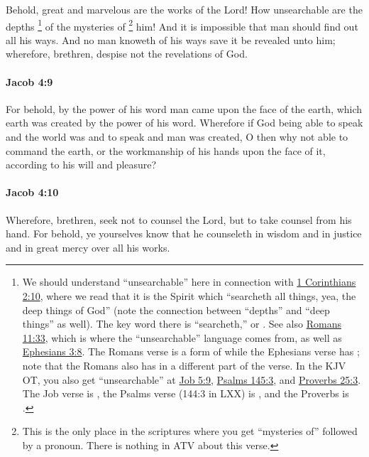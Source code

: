 			Behold, great and marvelous are the works of the Lord!
			How unsearchable are the depths%
				\footnote{%
					We should understand ``unsearchable'' here in connection with \hyperref[1CORINTHIANS-2-10]{1 Corinthians 2:10}, where we read that it is the Spirit which ``searcheth all things, yea, the deep things of God'' (note the connection between ``depths'' and ``deep things'' as well). The key word there is ``searcheth,'' or \hyperref[ERAUNAO]{}. See also \hyperref[ROMANS-11-33]{Romans 11:33}, which is where the ``unsearchable'' language comes from, as well as \hyperref[EPHESIANS-3-8]{Ephesians 3:8}. The Romans verse is a form of  while the Ephesians verse has ; note that the Romans also has  in a different part of the verse. In the KJV OT, you also get ``unsearchable'' at \hyperref[JOB-5-9]{Job 5:9}, \hyperref[PSALMS-145-3]{Psalms 145:3}, and \hyperref[PROVERBS-25-3]{Proverbs 25:3}. The Job verse is , the Psalms verse (144:3 in LXX) is , and the Proverbs is .
					}
			of the mysteries of
				\footnote{%
					This is the only place in the scriptures where you get ``mysteries of'' followed by a pronoun. There is nothing in ATV about this verse.
					}%
			him!
			And it is impossible that man should find out all his ways.
			And no man knoweth of his ways save it be revealed unto him;
			wherefore, brethren, despise not the revelations of God.

		\paragraph{Jacob 4:9} %
			\label{JACOB-4-9}

			For behold, by the power of his word
			man came upon the face of the earth,
			which earth was created by the power of his word.
			Wherefore if God being able to speak and the world was
			and to speak and man was created,
			O then why not able to command the earth,
			or the workmanship of his hands upon the face of it,
			according to his will and pleasure?

		\paragraph{Jacob 4:10} %
			\label{JACOB-4-10}

			Wherefore, brethren, seek not to counsel the Lord,
			but to take counsel from his hand.
			For behold, ye yourselves know that he counseleth
			in wisdom and in justice and in great mercy over all his works.

